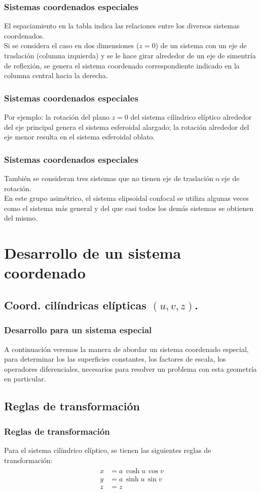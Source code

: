 \documentclass[12pt]{beamer}
\begin{document}
\begin{frame}
\frametitle{Sistemas coordenados especiales}
El espaciamiento en la tabla indica las relaciones entre los diversos sistemas coordenados.
\\
\bigskip
Si se considera el caso en dos dimensiones ($z = 0$) de un sistema con un eje de traslación (columna izquierda) y se le hace girar alrededor de un eje de simentría de reflexión, se genera el sistema coordenado correspondiente indicado en la columna central hacia la derecha.
\end{frame}
\begin{frame}
\frametitle{Sistemas coordenados especiales}
Por ejemplo: la rotación del plano $z = 0$ del sistema cilíndrico elíptico alrededor del eje principal genera el sistema esferoidal alargado; la rotación alrededor del eje menor resulta en el sistema esferoidal oblato.
\end{frame}
\begin{frame}
\frametitle{Sistemas coordenados especiales}
También se consideran tres sistemas que no tienen eje de traslación o eje de rotación.
\\
\bigskip
En este grupo asimétrico, el sistema elipsoidal confocal se utiliza algunas veces como el sistema más general y del que casi todos los demás sistemas se obtienen del mismo.
\end{frame}
\section{Desarrollo de un sistema coordenado}
\subsection{Coord. cilíndricas elípticas \texorpdfstring{$(u, v, z)$}{(u, v, z)}.}
\begin{frame}
\frametitle{Desarrollo para un sistema especial}
A continuación veremos la manera de abordar un sistema coordenado especial, para determinar los las superficies constantes, los factores de escala, los operadores diferenciales, necesarios para resolver un problema con esta geometría en particular.
\end{frame}
\subsection{Reglas de transformación}
\begin{frame}
\frametitle{Reglas de transformación}
Para el sistema cilíndrico elíptico, se tienen las siguientes reglas de transformación:
\begin{align}
\begin{aligned}
x &= a \, \cosh u \, \cos v \\
y &= a \, \sinh u \, \sin v \\
z &= z
\end{aligned}
\label{eq:ecuacion_02_73_esp}
\end{align}
\end{frame}
\end{document}
